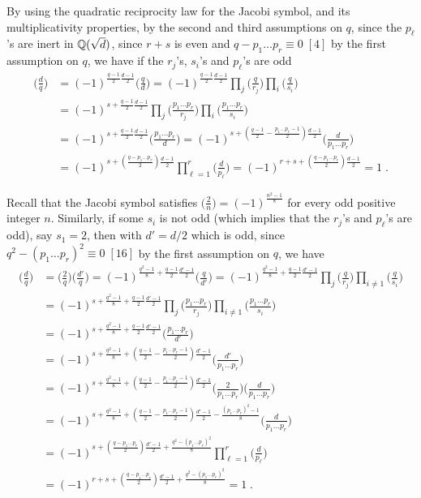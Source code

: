 \documentclass[11pt]{article}
\begin{document}
By using the quadratic reciprocity law for the Jacobi symbol, and its
multiplicativity properties, by the second and third assumptions on
$q$, since the $p_\ell$'s are inert in ${\mathbb Q}(\sqrt{d})$, since $r+s$ is
even and $q-p_1\dots p_r\equiv 0\;[4]$ by the first assumption on $q$,
we have if the $r_j$'s, $s_i$'s and $p_\ell$'s are odd
\begin{align*}
\big(\frac{d}{q}\big)&=(-1)^{\frac{q-1}2\frac{d-1}2}
\big(\frac{q}{d}\big)=(-1)^{\frac{q-1}2\frac{d-1}2}
\prod_{j}\big(\frac{q}{r_j}\big)\prod_{i}
\big(\frac{q}{s_i}\big)\nonumber\\ &=(-1)^{s+\frac{q-1}2\frac{d-1}2}
\prod_{j}\big(\frac{p_1\dots p_r}{r_j}\big)\prod_{i}
\big(\frac{p_1\dots p_r}{s_i}\big)\nonumber\\ &=(-1)^{s+\frac{q-1}2\frac{d-1}2}
\big(\frac{p_1\dots p_r}{d}\big)=
(-1)^{s+(\frac{q-1}2-\frac{p_1\dots p_r-1}2)\frac{d-1}2}
\big(\frac{d}{p_1\dots p_r}\big)\nonumber\\&=
(-1)^{s+(\frac{q-p_1\dots p_r}2)\frac{d-1}2}
\prod_{\ell=1}^r\big(\frac{d}{p_\ell}\big)=
(-1)^{r+s+(\frac{q-p_1\dots p_r}2)\frac{d-1}2}=1\;.
\end{align*}

Recall that the Jacobi symbol satisfies $\big(\frac{2}{n}\big)
=(-1)^{\frac{n^2-1}{8}}$ for every odd positive integer $n$.
Similarly, if some $s_i$ is not odd (which implies that the $r_j$'s
and $p_\ell$'s are odd), say $s_1=2$, then with $d'=d/2$ which is odd,
since $q^2- (p_1\dots p_r)^2\equiv 0\;[16]$ by the first assumption on
$q$, we have
\begin{align*}
\big(\frac{d}{q}\big)&=\big(\frac{2}{q}\big)\big(\frac{d'}{q}\big)
=(-1)^{\frac{q^2-1}{8}+\frac{q-1}2\frac{d'-1}2}
\big(\frac{q}{d'}\big)=(-1)^{\frac{q^2-1}{8}+\frac{q-1}2\frac{d'-1}2}
\prod_{j}\big(\frac{q}{r_j}\big)\prod_{i\neq 1}
\big(\frac{q}{s_i}\big)\\ &=(-1)^{s+\frac{q^2-1}{8}+\frac{q-1}2\frac{d'-1}2}
\prod_{j}\big(\frac{p_1\dots p_r}{r_j}\big)\prod_{i\neq 1}
\big(\frac{p_1\dots p_r}{s_i}\big)\\ &=
(-1)^{s+\frac{q^2-1}{8}+\frac{q-1}2\frac{d'-1}2}
\big(\frac{p_1\dots p_r}{d'}\big)\\ &=
(-1)^{s+\frac{q^2-1}{8}+(\frac{q-1}2-\frac{p_1\dots p_r-1}2)\frac{d'-1}2}
\big(\frac{d'}{p_1\dots p_r}\big)\\&=
(-1)^{s+\frac{q^2-1}{8}+(\frac{q-1}2-\frac{p_1\dots p_r-1}2)\frac{d'-1}2}
\big(\frac{2}{p_1\dots p_r}\big)\big(\frac{d}{p_1\dots p_r}\big)\\&=
(-1)^{s+\frac{q^2-1}{8}+(\frac{q-1}2-\frac{p_1\dots p_r-1}2)\frac{d'-1}2-
\frac{(p_1\dots p_r)^2-1}{8}} \big(\frac{d}{p_1\dots p_r}\big)\\&=
(-1)^{s+(\frac{q-p_1\dots p_r}2)\frac{d'-1}2+\frac{q^2-(p_1\dots p_r)^2}{8}}
\prod_{\ell=1}^r\big(\frac{d}{p_\ell}\big)\\&=
(-1)^{r+s+(\frac{q-p_1\dots p_r}2)\frac{d'-1}2+\frac{q^2-(p_1\dots p_r)^2}{8}}=1\;.
\end{align*}
\end{document}
